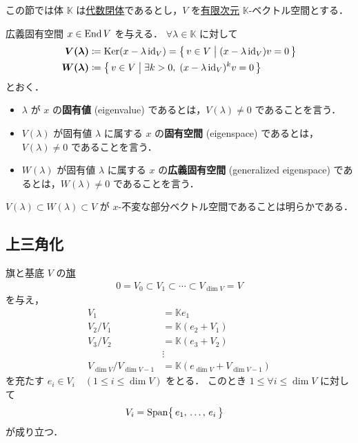 \documentclass[rep_main]{subfiles}
\begin{document}
この節では体 $\mathbb{K}$ は\underline{代数閉体}であるとし，$V$ を\underline{有限次元} $\mathbb{K}$-ベクトル空間とする．

\begin{mydef}[label=def:eigen,breakable]{広義固有空間}
    $x \in \operatorname{End} V$ を与える．
    $\forall \lambda \in \mathbb{K}$ に対して
    \begin{align}
        \bm{V(\lambda)} &\coloneqq \operatorname{Ker} (x - \lambda\, \mathrm{id}_V) = \bigl\{\, v \in V \bigm| (x - \lambda\, \mathrm{id}_V) v = 0 \,\bigr\} \\
        \bm{W(\lambda)} &\coloneqq \bigl\{\, v \in V \bigm| \exists k > 0,\; (x - \lambda\, \mathrm{id}_V)^k v = 0 \,\bigr\}
    \end{align}
    とおく．
    \begin{itemize}
        \item $\lambda$ が $x$ の\textbf{固有値} (eigenvalue) であるとは，$V(\lambda) \neq 0$ であることを言う．
        \item $V(\lambda)$ が固有値 $\lambda$ に属する $x$ の\textbf{固有空間} (eigenspace) であるとは，$V(\lambda) \neq 0$ であることを言う．
        \item $W(\lambda)$ が固有値 $\lambda$ に属する $x$ の\textbf{広義固有空間} (generalized eigenspace) であるとは，$W(\lambda) \neq 0$ であることを言う．
    \end{itemize}
\end{mydef}

$V(\lambda) \subset W(\lambda) \subset V$ が $x$-不変な部分ベクトル空間であることは明らかである．

\subsection{上三角化}

\begin{mylem}[label=lem:flag,breakable]{旗と基底}
    $V$ の\hyperref[def:flag]{旗}
    \begin{align}
        0 = V_0 \subset V_1 \subset \cdots \subset V_{\dim V} = V
    \end{align}
    を与え，
    \begin{align}
        V_1 &= \mathbb{K}e_1 \\
        V_2 / V_1 &= \mathbb{K} (e_2 + V_1) \\
        V_3 / V_2 &= \mathbb{K} (e_3 + V_2) \\
        &\vdots \\
        V_{\dim V} / V_{\dim V - 1} &= \mathbb{K} (e_{\dim V} + V_{\dim V - 1})
    \end{align}
    を充たす $e_i \in V_i\quad (1 \le i \le \dim V)$ をとる．
    このとき $1 \le \forall i \le \dim V$ に対して
    \begin{align}
        V_i &= \operatorname{Span} \bigl\{\, e_1,\, \dots,\, e_i  \,\bigr\}
    \end{align}
    が成り立つ．
\end{mylem}
\end{document}
